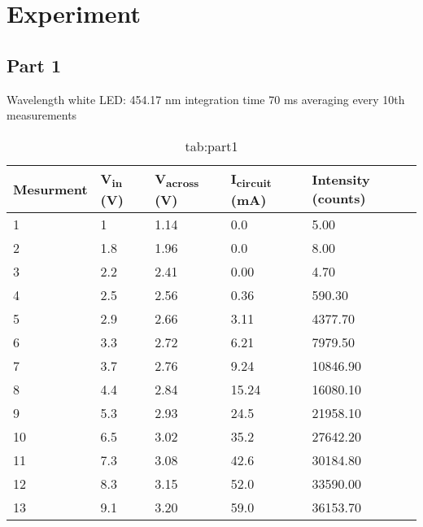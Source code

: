 \section{Experiment}
\subsection{Part 1}

Wavelength white LED: 454.17 nm 
integration time 70 ms 
averaging every 10th measurements


\begin{table}[H]
    \centering
    \begin{tabular}{@{}lllll@{}}
        \toprule
        Mesurment & V\textsubscript{in} (V) & V\textsubscript{across} (V) & I\textsubscript{circuit} (mA) & Intensity (counts) \\ \midrule
        1         & 1                       & 1.14                        & 0.0                           & 5.00               \\
        2         & 1.8                     & 1.96                        & 0.0                           & 8.00               \\
        3         & 2.2                     & 2.41                        & 0.00                          & 4.70               \\
        4         & 2.5                     & 2.56                        & 0.36                          & 590.30             \\
        5         & 2.9                     & 2.66                        & 3.11                          & 4377.70            \\
        6         & 3.3                     & 2.72                        & 6.21                          & 7979.50            \\
        7         & 3.7                     & 2.76                        & 9.24                          & 10846.90           \\
        8         & 4.4                     & 2.84                        & 15.24                         & 16080.10           \\
        9         & 5.3                     & 2.93                        & 24.5                          & 21958.10           \\
        10        & 6.5                     & 3.02                        & 35.2                          & 27642.20           \\
        11        & 7.3                     & 3.08                        & 42.6                          & 30184.80           \\
        12        & 8.3                     & 3.15                        & 52.0                          & 33590.00           \\
        13        & 9.1                     & 3.20                        & 59.0                          & 36153.70           \\ \bottomrule
        \end{tabular}
    \caption{tab:part1}
\end{table}


